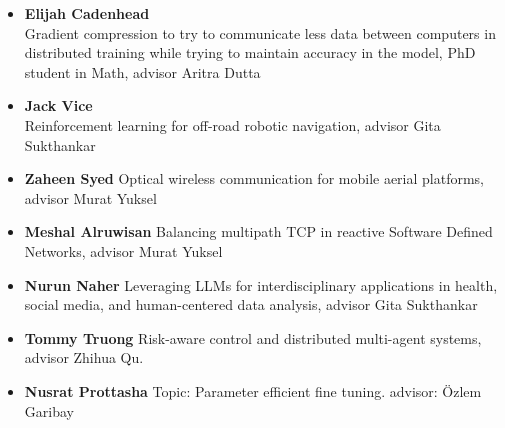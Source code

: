 \begin{itemize}
\item\textbf{Elijah Cadenhead} \\
Gradient compression to try to communicate less data between computers in distributed training while trying to maintain accuracy in the model, PhD student in Math, advisor Aritra Dutta

\item\textbf{Jack Vice}\\
Reinforcement learning for off-road robotic navigation, advisor Gita Sukthankar

\item\textbf{Zaheen Syed}
Optical wireless communication for mobile aerial platforms, advisor Murat Yuksel 

\item\textbf{Meshal Alruwisan}
Balancing multipath TCP in reactive Software Defined Networks, advisor Murat Yuksel 

\item\textbf{Nurun Naher}
Leveraging LLMs for interdisciplinary applications in health, social media, and human-centered data analysis, advisor Gita Sukthankar


\item\textbf{Tommy Truong}
Risk-aware control and distributed multi-agent systems, advisor Zhihua Qu.


\item\textbf{Nusrat Prottasha}
Topic: Parameter efficient fine tuning. 
advisor: Özlem Garibay

\end{itemize}